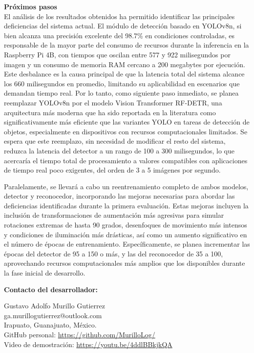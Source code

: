 {\sffamily{}\color{MASA-Blue} \textbf{Próximos pasos}}\\
El análisis de los resultados obtenidos ha permitido identificar las principales deficiencias del sistema actual. El módulo de detección basado en YOLOv8n, si bien alcanza una precisión excelente del 98.7\% en condiciones controladas, es responsable de la mayor parte del consumo de recursos durante la inferencia en la Raspberry Pi 4B, con tiempos que oscilan entre 577 y 922 milisegundos por imagen y un consumo de memoria RAM cercano a 200 megabytes por ejecución. Este desbalance es la causa principal de que la latencia total del sistema alcance los 660 milisegundos en promedio, limitando su aplicabilidad en escenarios que demandan tiempo real. Por lo tanto, como siguiente paso inmediato, se planea reemplazar YOLOv8n por el modelo Vision Transformer RF-DETR, una arquitectura más moderna que ha sido reportada en la literatura como significativamente más eficiente que las variantes YOLO en tareas de detección de objetos, especialmente en dispositivos con recursos computacionales limitados. Se espera que este reemplazo, sin necesidad de modificar el resto del sistema, reduzca la latencia del detector a un rango de 100 a 300 milisegundos, lo que acercaría el tiempo total de procesamiento a valores compatibles con aplicaciones de tiempo real poco exigentes, del orden de 3 a 5 imágenes por segundo.

Paralelamente, se llevará a cabo un reentrenamiento completo de ambos modelos, detector y reconocedor, incorporando las mejoras necesarias para abordar las deficiencias identificadas durante la primera evaluación. Estas mejoras incluyen la inclusión de transformaciones de aumentación más agresivas para simular rotaciones extremas de hasta 90 grados, desenfoques de movimiento más intensos y condiciones de iluminación más drásticas, así como un aumento significativo en el número de épocas de entrenamiento. Específicamente, se planea incrementar las épocas del detector de 95 a 150 o más, y las del reconocedor de 35 a 100, aprovechando recursos computacionales más amplios que los disponibles durante la fase inicial de desarrollo.

\vspace{1cm}
{\sffamily{}\color{MASA-Blue} \textbf{Contacto del desarrollador:}}

\begin{minipage}{0.15\textwidth}
\end{minipage}
\begin{minipage}{0.7\textwidth}
Gustavo Adolfo Murillo Gutierrez \\
ga.murillogutierrez@outlook.com \\
Irapuato, Guanajuato, México. \\
GitHub personal: \url{https://github.com/MurilloLog/} \\
Video de demostración: \url{https://youtu.be/4ddlBBkjkQA}
\end{minipage}